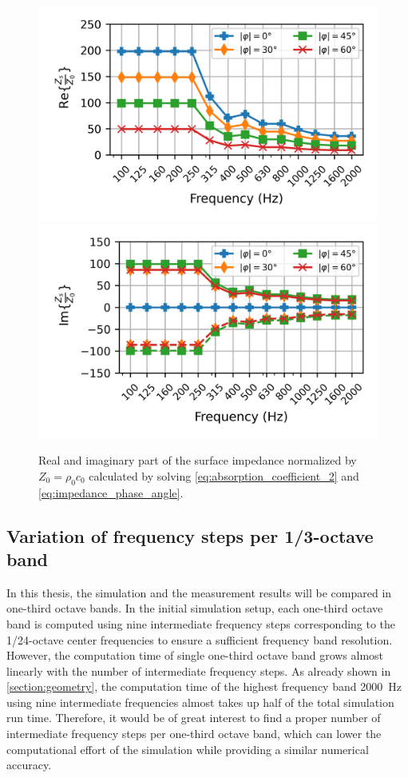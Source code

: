 \begin{figure}[H]
	\centering
	\includegraphics{fig/chap4/impedance/impedance_real.png}
	\includegraphics{fig/chap4/impedance/impedance_imag.png}
	\caption{Real and imaginary part of the surface impedance normalized by $Z_0 = \rho_0 c_0$ calculated by solving \cref{eq:absorption_coefficient_2} and \cref{eq:impedance_phase_angle}.}
	\label{fig:input_impedance}
\end{figure}

\newpage
\subsection{Variation of frequency steps per 1/3-octave band}

In this thesis, the simulation and the measurement results will be compared in one-third octave bands.
In the initial simulation setup, each one-third octave band is computed using nine intermediate frequency steps corresponding to the 1/24-octave center frequencies to ensure a sufficient frequency band resolution.
However, the computation time of single one-third octave band grows almost linearly with the number of intermediate frequency steps.
As already shown in \cref{section:geometry}, the computation time of the highest frequency band \SI{2000}{Hz} using nine intermediate frequencies almost takes up half of the total simulation run time.
Therefore, it would be of great interest to find a proper number of intermediate frequency steps per one-third octave band, which can lower the computational effort of the simulation while providing a similar numerical accuracy.

